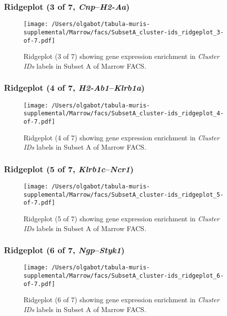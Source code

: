 \clearpage

\subsubsection{Ridgeplot (3 of 7, \emph{Cnp}--\emph{H2-Aa})}
\begin{figure}[h]
\centering
\texttt{[image: /Users/olgabot/tabula-muris-supplemental/Marrow/facs/SubsetA\_cluster-ids\_ridgeplot\_3-of-7.pdf]}

\caption{ Ridgeplot (3 of 7)  showing gene expression enrichment in \emph{Cluster IDs} labels in Subset A of Marrow FACS. }
\end{figure}


\clearpage

\subsubsection{Ridgeplot (4 of 7, \emph{H2-Ab1}--\emph{Klrb1a})}
\begin{figure}[h]
\centering
\texttt{[image: /Users/olgabot/tabula-muris-supplemental/Marrow/facs/SubsetA\_cluster-ids\_ridgeplot\_4-of-7.pdf]}

\caption{ Ridgeplot (4 of 7)  showing gene expression enrichment in \emph{Cluster IDs} labels in Subset A of Marrow FACS. }
\end{figure}


\clearpage

\subsubsection{Ridgeplot (5 of 7, \emph{Klrb1c}--\emph{Ncr1})}
\begin{figure}[h]
\centering
\texttt{[image: /Users/olgabot/tabula-muris-supplemental/Marrow/facs/SubsetA\_cluster-ids\_ridgeplot\_5-of-7.pdf]}

\caption{ Ridgeplot (5 of 7)  showing gene expression enrichment in \emph{Cluster IDs} labels in Subset A of Marrow FACS. }
\end{figure}


\clearpage

\subsubsection{Ridgeplot (6 of 7, \emph{Ngp}--\emph{Styk1})}
\begin{figure}[h]
\centering
\texttt{[image: /Users/olgabot/tabula-muris-supplemental/Marrow/facs/SubsetA\_cluster-ids\_ridgeplot\_6-of-7.pdf]}

\caption{ Ridgeplot (6 of 7)  showing gene expression enrichment in \emph{Cluster IDs} labels in Subset A of Marrow FACS. }
\end{figure}


